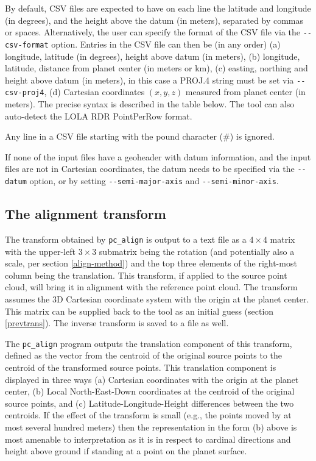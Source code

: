 By default, CSV files are expected to have on each line the latitude and
longitude (in degrees), and the height above the datum (in meters),
separated by commas or spaces. Alternatively, the user can specify the
format of the CSV file via the \texttt{-\/-csv-format} option. Entries
in the CSV file can then be (in any order) (a) longitude, latitude (in
degrees), height above datum (in meters), (b) longitude, latitude,
distance from planet center (in meters or km), (c) easting, northing and
height above datum (in meters), in this case a PROJ.4 string must be set
via \texttt{-\/-csv-proj4}, (d) Cartesian coordinates $(x, y, z)$
measured from planet center (in meters). The precise syntax is described
in the table below. The tool can also auto-detect the LOLA RDR
PointPerRow format.

Any line in a CSV file starting with the pound character (\#) is ignored.

If none of the input files have a geoheader with datum information, and
the input files are not in Cartesian coordinates, the datum needs to be
specified via the \texttt{-\/-datum} option, or by setting
\texttt{-\/-semi-major-axis} and \texttt{-\/-semi-minor-axis}.

\subsection{The alignment transform}

The transform obtained by \texttt{pc\_align} is output to a text file as
a $4\times 4$ matrix with the upper-left $3\times 3$ submatrix being the
rotation (and potentially also a scale, per section \ref{align-method}) and
the top three elements of the right-most column being the
translation. This transform, if applied to the source point cloud, will
bring it in alignment with the reference point cloud. The transform
assumes the 3D Cartesian coordinate system with the origin at the planet
center. This matrix can be supplied back to the tool as an initial guess
(section \ref{prevtrans}). The inverse transform is saved to a file as
well.

The \texttt{pc\_align} program outputs the translation component of this
transform, defined as the vector from the centroid of the original
source points to the centroid of the transformed source points. This
translation component is displayed in three ways (a) Cartesian
coordinates with the origin at the planet center, (b) Local
North-East-Down coordinates at the centroid of the original source
points, and (c) Latitude-Longitude-Height differences between the two
centroids. If the effect of the transform is small (e.g., the points
moved by at most several hundred meters) then the representation in the
form (b) above is most amenable to interpretation as it is in respect
to cardinal directions and height above ground if standing at a point on
the planet surface.


